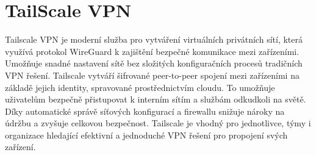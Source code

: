 \section{TailScale VPN}\label{sec:tailscale}
Tailscale VPN je moderní služba pro vytváření virtuálních privátních sítí, která využívá protokol WireGuard k zajištění bezpečné komunikace mezi zařízeními. Umožňuje snadné nastavení sítě bez složitých konfiguračních procesů tradičních VPN řešení. Tailscale vytváří šifrované peer-to-peer spojení mezi zařízeními na základě jejich identity, spravované prostřednictvím cloudu. To umožňuje uživatelům bezpečně přistupovat k interním sítím a službám odkudkoli na světě. Díky automatické správě síťových konfigurací a firewallu snižuje nároky na údržbu a zvyšuje celkovou bezpečnost. Tailscale je vhodný pro jednotlivce, týmy i organizace hledající efektivní a jednoduché VPN řešení pro propojení svých zařízení.
